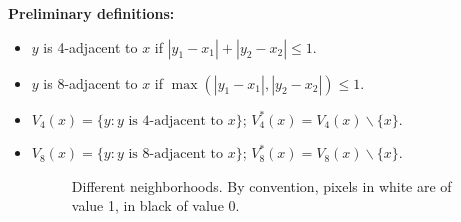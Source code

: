 \noindent \textbf{Preliminary definitions:}
\begin{itemize}
	\item  $y$ is 4-adjacent to $x$ if $|y_1-x_1|+|y_2-x_2|\leq 1$.
	\item  $y$ is 8-adjacent to $x$ if $\max(|y_1-x_1|,|y_2-x_2|)\leq 1$.
	\item $V_4(x)=\{y:y\text{ is 4-adjacent to } x\}$; $V_4^*(x)=V_4(x)\backslash \{x\}$.
	\item $V_8(x)=\{y:y\text{ is 8-adjacent to } x\}$; $V_8^*(x)=V_8(x)\backslash \{x\}$.

\vspace*{-8pt}
\begin{figure}[H]
\centering\caption{Different neighborhoods. By convention, pixels in white are of value 1, in black of value 0.}%
\hfill
%
\hfill
%
\end{figure}
\end{itemize}
